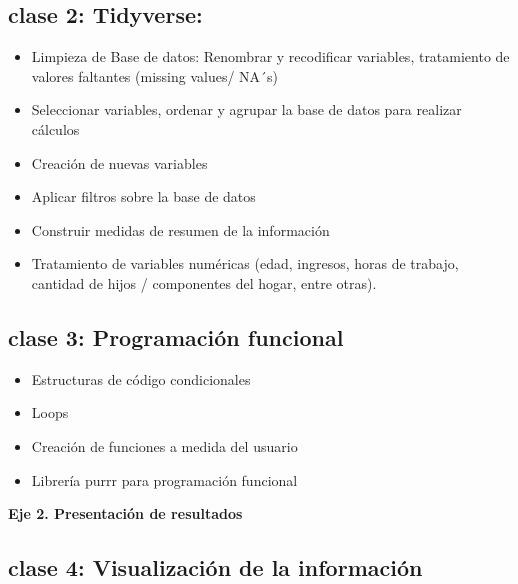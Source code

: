 \documentclass[]{book}
\providecommand{\tightlist}{%
  \setlength{\itemsep}{0pt}\setlength{\parskip}{0pt}}
\begin{document}
\hypertarget{clase-2-tidyverse}{%
\subsection{\texorpdfstring{\textbf{clase 2}: Tidyverse:}{clase 2: Tidyverse:}}\label{clase-2-tidyverse}}

\begin{itemize}
\tightlist
\item
  Limpieza de Base de datos: Renombrar y recodificar variables, tratamiento de valores faltantes (missing values/ NA´s)
\item
  Seleccionar variables, ordenar y agrupar la base de datos para realizar cálculos
\item
  Creación de nuevas variables
\item
  Aplicar filtros sobre la base de datos
\item
  Construir medidas de resumen de la información
\item
  Tratamiento de variables numéricas (edad, ingresos, horas de trabajo, cantidad de hijos / componentes del hogar, entre otras).
\end{itemize}

\hypertarget{clase-3-programacion-funcional}{%
\subsection{\texorpdfstring{\textbf{clase 3}: Programación funcional}{clase 3: Programación funcional}}\label{clase-3-programacion-funcional}}

\begin{itemize}
\tightlist
\item
  Estructuras de código condicionales
\item
  Loops
\item
  Creación de funciones a medida del usuario
\item
  Librería purrr para programación funcional
\end{itemize}

\textbf{Eje 2. Presentación de resultados}

\hypertarget{clase-4-visualizacion-de-la-informacion}{%
\subsection{\texorpdfstring{\textbf{clase 4}: Visualización de la información}{clase 4: Visualización de la información}}\label{clase-4-visualizacion-de-la-informacion}}
\end{document}
